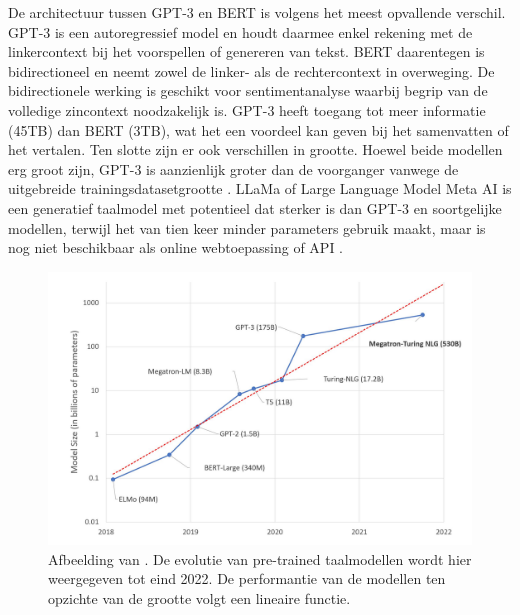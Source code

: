 \medspace

De architectuur tussen GPT-3 en BERT is volgens \textcite{Mottesi2023} het meest opvallende verschil. GPT-3 is een autoregressief model en houdt daarmee enkel rekening met de linkercontext bij het voorspellen of genereren van tekst. BERT daarentegen is bidirectioneel en neemt zowel de linker- als de rechtercontext in overweging. De bidirectionele werking is geschikt voor sentimentanalyse waarbij begrip van de volledige zincontext noodzakelijk is. GPT-3 heeft toegang tot meer informatie (45TB) dan BERT (3TB), wat het een voordeel kan geven bij het samenvatten of het vertalen. Ten slotte zijn er ook verschillen in grootte. Hoewel beide modellen erg groot zijn, GPT-3 is aanzienlijk groter dan de voorganger vanwege de uitgebreide trainingsdatasetgrootte \autocite{Brown2020}. LLaMa of Large Language Model Meta AI is een generatief taalmodel met potentieel dat sterker is dan GPT-3 en soortgelijke modellen, terwijl het van tien keer minder parameters gebruik maakt, maar is nog niet beschikbaar als online webtoepassing of API \autocite{Hern2023, Touvron2023}.


\begin{figure}[H]
	\includegraphics{img/graph-language-models.png}
	\caption{Afbeelding van \textcite{Simon2021}. De evolutie van pre-trained taalmodellen wordt hier weergegeven tot eind 2022. De performantie van de modellen ten opzichte van de grootte volgt een lineaire functie.}
\end{figure}

\medspace


